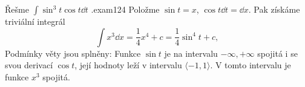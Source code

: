 \begin{mathexam}{Řešme \(\int\sin^3t\cos t\dd{t}\) \hfill\cite[s.~261]{Brabec1989}.}{exam124}
  Položme \(\sin t = x\), \(\cos t\dd{t} =\dd{x}\). Pak získáme triviální integrál
  \begin{equation*}
    \int x^3\dd{x} = \frac{1}{4}x^4 + c = \frac{1}{4}\sin^4t + c,
  \end{equation*}
  Podmínky věty jsou splněny: Funkce \(\sin t\) je na intervalu \(-\infty, +\infty\) spojitá i se
  svou derivací \(\cos t\), její hodnoty leží v intervalu \(\langle-1,1\rangle\). V tomto intervalu
  je funkce \(x^3\) spojitá. 
\end{mathexam}